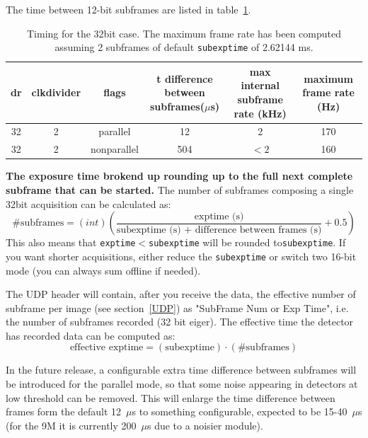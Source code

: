 \documentclass{article}
\begin{document}
The time between 12-bit subframes are listed in table~\ref{t32bitframe}.  
\begin{tiny}
\begin{table}
\begin{flushleft}
\begin{tabular}{|c|c|c|c|c|c|}
\hline
\tiny{dr} & \tiny{clkdivider} & \tiny{flags} & \tiny{t difference between subframes($\mu$s)} & \tiny{max internal subframe rate (kHz)} & \tiny{maximum frame rate (Hz)}\\
\hline
32 & 2 & parallel & 12 & 2 & 170\\
\hline
32 & 2 & nonparallel & 504 & $<2$ & 160\\
\hline
\end{tabular}
\caption{Timing for the 32bit case. The maximum frame rate has been computed assuming 2 subframes of default {\tt{subexptime}} of 2.62144 ms.}
\label{t32bitframe}
\end{flushleft}
\end{table}
\end{tiny}

\textbf{The exposure time brokend up rounding up to the full next complete subframe that can be started.}
The number of subframes composing a single 32bit acquisition can be calculated as:
\begin{equation}
\textrm{\# subframes}= (int) (\frac{\textrm{exptime (s)}}{\textrm{subexptime (s) + difference between frames (s)}}+0.5)
\end{equation}
This also means that {\tt{exptime}}$<${\tt{subexptime}} will be rounded to{\tt{subexptime}}. If you want shorter acquisitions, either reduce the {\tt{subexptime}} or switch two 16-bit mode (you can always sum offline if needed).   

The UDP header will contain, after you receive the data, the effective number of subframe per image (see section~\ref{UDP}) as  "SubFrame Num or Exp Time", i.e. the number of subframes recorded  (32 bit eiger).
The effective time the detector has recorded data can be computed as:
\begin{equation}
\textrm{effective exptime}=(\textrm{subexptime})\cdot (\textrm{\# subframes})
\end{equation}

In the future release, a configurable extra time difference between subframes will be introduced for the parallel mode, so that some noise appearing in detectors at low threshold can be removed. This will enlarge the time difference between frames form the default 12~$\mu$s to something configurable, expected to be 15-40~$\mu$s (for the 9M it is currently 200~$\mu$s due to a noisier module).
\end{document}
